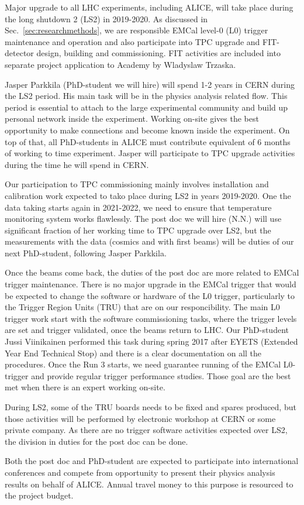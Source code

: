 Major upgrade to all LHC experiments, including ALICE, will take place during the long shutdown 2 (LS2) in 2019-2020. As discussed in Sec.~\ref{sec:researchmethods}, we are responsible EMCal level-0 (L0) trigger maintenance and operation and also participate into TPC upgrade and FIT-detector design, building and commissioning. FIT activities are included into separate project application to Academy by Wladyslaw Trzaska. 

Jasper Parkkila (PhD-student we will hire) will spend 1-2 years in CERN during the LS2 period. His main task will be in the physics analysis related flow. This period is essential to attach to the large experimental community and build up personal network inside the experiment. Working on-site gives the best opportunity to make connections and become known inside the experiment. On top of that, all PhD-students in ALICE must contribute equivalent of 6 months of working to time experiment. Jasper will participate to TPC upgrade activities during the time he will spend in CERN.

Our participation to TPC commissioning mainly involves installation and calibration work expected to tako place during LS2 in years 2019-2020. One the data taking starts again in 2021-2022, we need to ensure that temperature monitoring system works flawlessly. The post doc we will hire (N.N.) will use significant fraction of her working time to TPC upgrade over LS2, but the measurements with the data (cosmics and with first beams) will be duties of our next PhD-student, following Jasper Parkkila.

Once the beams come back, the duties of the post doc are more related to EMCal trigger maintenance. There is no major upgrade in the EMCal trigger that would be expected to change the software or hardware of the L0 trigger, particularly to the Trigger Region Units (TRU) that are on our responcibility. The main L0 trigger work start with the software commissioning tasks, where the trigger levels are set and trigger validated, once the beams return to LHC. Our PhD-student Jussi Viinikainen performed this task during spring 2017 after EYETS (Extended Year End Technical Stop) and there is a clear documentation on all the procedures. Once the Run 3 starts, we need guarantee running of the EMCal L0-trigger and provide regular trigger performance studies. Those goal are the best met when there is an expert working on-site.

During LS2, some of the TRU boards needs to be fixed and spares produced, but those activities will be performed by electronic workshop at CERN or some private company. As there are no trigger software activities expected over LS2, the division in duties for the post doc can be done.

Both the post doc and PhD-student are expected to participate into international conferences and compete from opportunity to present their physics analysis results on behalf of ALICE. Annual travel money to this purpose is resourced to the project budget.

\nopagebreak
